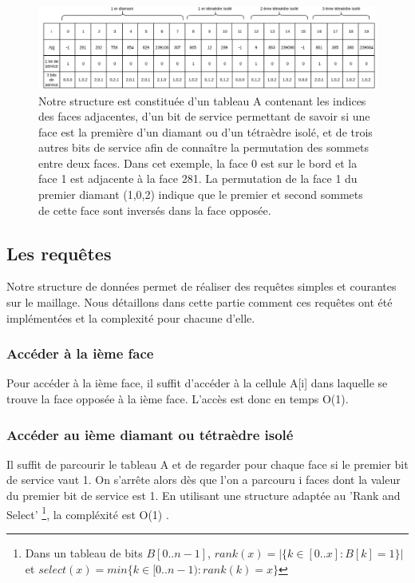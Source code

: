 \begin{figure}[H]
\begin{center}
\includegraphics[scale=0.35]{Images/structure}
\caption{Notre structure est constituée d'un tableau A contenant les indices des faces adjacentes, d'un bit de service permettant de savoir si une face est la première d'un diamant ou d'un tétraèdre isolé, et de trois autres bits de service afin de connaître la permutation des sommets entre deux faces. Dans cet exemple, la face 0 est sur le bord et la face 1 est adjacente à la face 281. La permutation de la face 1 du premier diamant (1,0,2) indique que le premier et second sommets de cette face sont inversés dans la face opposée.}
\label{fig:structure}
\end{center}
\end{figure}
\subsection{Les requêtes}
\noindent
Notre structure de données permet de réaliser des requêtes simples et courantes sur le maillage. Nous détaillons dans cette partie comment ces requêtes ont été implémentées et la complexité pour chacune d'elle.
\subsubsection{Accéder à la ième face}
\noindent
Pour accéder à la ième face, il suffit d'accéder à la cellule A[i] dans laquelle se trouve la face opposée à la ième face. L'accès est donc en temps O(1).
\subsubsection{Accéder au ième diamant ou tétraèdre isolé}
\noindent
Il suffit de parcourir le tableau A et de regarder pour chaque face si le premier bit de service vaut 1. On s'arrête alors dès que l'on a parcouru i faces dont la valeur du premier bit de service est 1. En utilisant une structure adaptée au 'Rank and Select' \footnote{Dans un tableau de bits $B[0..n-1]$, $rank(x) = |\{k\in [0..x] : B[k]=1\}|$ et $select(x)=min\{k\in [0..n-1) : rank(k)=x\}$}, la compléxité est O(1) \cite{rank_and_select}.
